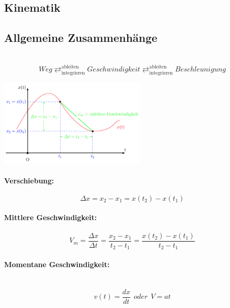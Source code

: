 \documentclass[7pt]{article}
\begin{document}
\begin{multicols*}{3}

\section{Kinematik}

\subsection{Allgemeine Zusammenh{\"a}nge}
\mbox{} \\
\[Weg \mathrel{\mathop{\rightleftarrows}^{\mathrm{ableiten}}_{\mathrm{integrieren}}} Geschwindigkeit \mathrel{\mathop{\rightleftarrows}^{\mathrm{ableiten}}_{\mathrm{integrieren}}} Beschleunigung\]
\newline

\begin{center}
	\includegraphics[width=200pt]{images/kinematik}
\end{center}

\paragraph{Verschiebung:}
\begin{equation*}
	{\Delta}x = x_2 - x_1 = x(t_2) - x(t_1) 
\end{equation*}

\paragraph{Mittlere Geschwindigkeit:}
\begin{equation*}
	V_m = \frac{{\Delta}x}{{\Delta}t} =  \frac{x_2 - x_1}{t_2 - t_1} = \frac{x(t_2) - x(t_1)}{t_2 - t_1}
\end{equation*}

\paragraph{Momentane Geschwindigkeit:}\mbox{} \\
\begin{equation*}
	v(t) = \frac{dx}{dt}	 \>\>oder\>\> V = at
\end{equation*}


\end{multicols*}
\end{document}
